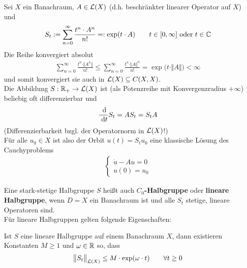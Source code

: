 \begin{beispiel}[Exponentialfunktion]\enter
	Sei $X$ ein Banachraum, $A\in\mathcal{L}(X)$ (d.h. beschränkter linearer Operator auf $X$) und 
	\begin{align*}
		S_t:=\sum\limits_{n=0}^\infty\frac{t^n\cdot A^n}{n!}=:\exp(t\cdot A)\qquad t\in[0,\infty]\text{ oder }t\in\mathbb{C}
	\end{align*}
	Die Reihe konvergiert absolut
	\begin{align*}
		\sum\limits_{n=0}^\infty \frac{t^n\cdot\Vert A^n\Vert}{n!}\leq\sum\limits_{n=0}^\infty\frac{t^n\cdot\Vert A\Vert^n}{	n!}=\exp\big(t\cdot\Vert A\Vert\big)<\infty
	\end{align*}
	und somit konvergiert sie auch in $\mathcal{L}(X)\subseteq C(X,X)$.\\
	Die Abbildung $S:\mathbb{R}_+\to\mathcal{L}(X)$ ist (als Potenzreihe mit Konvergenzradius $+\infty$) beliebig oft differenzierbar und 
	\begin{align*}
		\frac{\text{ d}}{\text{ d} t}S_t=AS_t=S_tA
	\end{align*}
	(Differenzierbarkeit bzgl. der Operatornorm in $\mathcal{L}(X)$!)\\
	Für alle $u_0\in X$ ist also der Orbit $u(t)=S_t u_0$ eine klassische Lösung des Cauchyproblems
	\begin{align*}
		\left\lbrace\begin{array}{r}
			\dot{u}-Au=0\\
			u(0)=u_0
		\end{array}\right.
	\end{align*}
\end{beispiel}

\begin{beispiel}\enter
	Eine stark-stetige Halbgruppe $S$ heißt auch \textbf{$C_0$-Halbgruppe} oder \textbf{lineare Halbgruppe}, 
	wenn $D=X$ ein Banachraum ist und alle $S_t$ stetige, lineare Operatoren sind.\\
	Für lineare Halbgruppen gelten folgende Eigenschaften:
\end{beispiel}

\begin{lemma}
	Ist $S$ eine lineare Halbgruppe auf einem Banachraum $X$, dann existieren Konstanten $M\geq1$ und $\omega\in\mathbb{R}$ so, dass 
	\begin{align*}
		\big\Vert S_t\big\Vert_{\mathcal{L}(X)}\leq M\cdot\exp(\omega\cdot t)\qquad\forall t\geq0
	\end{align*}
\end{lemma}

